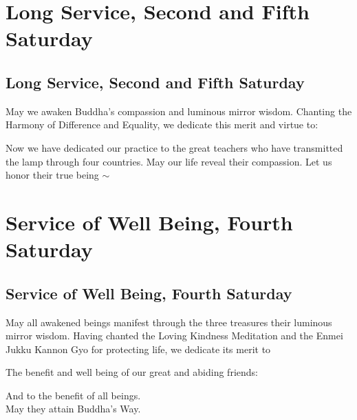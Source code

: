 \documentclass{kdo}
\begin{document}
\begin{services}
\part{Long Service, Second and Fifth Saturday}
\chapter{Long Service, Second and Fifth Saturday}

\begin{service}
\kokyo \makaHannyaHaramittaShingyo
\pagebreak
\kokyo \shosaimyoKichijoDharani
\kokyo {}
\sangha \allBuddhas*
\kokyo \harmonyOfDifferenceAndEquality
\kokyo May we awaken Buddha's compassion and luminous mirror wisdom. Chanting
the Harmony of Difference and Equality, we dedicate this merit and virtue to:

\begin{outdent}
  \ancestorsLong*
\end{outdent}

\kokyo Now we have dedicated our practice to the great teachers who have
transmitted the lamp through four countries. May our life reveal their
compassion. Let us honor their true being $\sim$ \largebell
\end{service}

\part{Service of Well Being, Fourth Saturday}
\chapter{Service of Well Being, Fourth Saturday}
\begin{service}
\kokyo \makaHannyaHaramittaShingyo
\pagebreak
\kokyo \shosaimyoKichijoDharani
\kokyo {}
\kokyo \lovingKindnessMeditation
\kokyo \enmeiJukkuKannonGyo
\kokyo May all awakened beings manifest through the three treasures their
luminous mirror wisdom. Having chanted the Loving Kindness Meditation and the
Enmei Jukku Kannon Gyo for protecting life, we dedicate its merit to

The benefit and well being of our great and abiding friends: \hrulefill

And to the benefit of all beings.\\
May they attain Buddha's Way. \largebell

\end{service}

\end{services}

\end{document}
